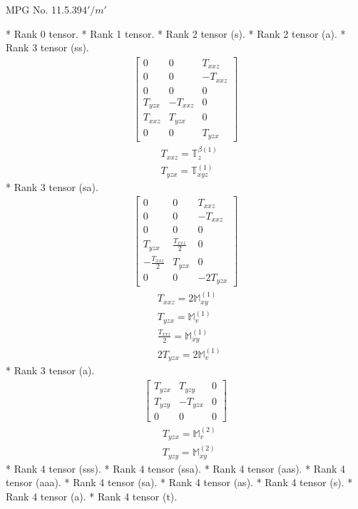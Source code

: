\documentclass[fleqn,8pt,landscape]{jsarticle}
\begin{document}
\setcounter{MaxMatrixCols}{32}

\renewcommand{\tablename}{Table~}
\renewcommand{\figurename}{Figure~}
\begin{center}
\LARGE
MPG No. 11.5.39\quad$4'/m'$
\end{center}
* Rank 0 tensor.
* Rank 1 tensor.
* Rank 2 tensor (s).
* Rank 2 tensor (a).
* Rank 3 tensor (ss).
\begin{align*}
\begin{bmatrix} 0 & 0 & T_{xxz} \\ 0 & 0 & - T_{xxz} \\ 0 & 0 & 0 \\ T_{yzx} & - T_{xxz} & 0 \\ T_{xxz} & T_{yzx} & 0 \\ 0 & 0 & T_{yzx} \end{bmatrix}
\end{align*}
\begin{align*}
& T_{xxz} = \mathbb{T}_{z}^{\beta(1)} \\
& T_{yzx} = \mathbb{T}_{xyz}^{(1)}
\end{align*}
* Rank 3 tensor (sa).
\begin{align*}
\begin{bmatrix} 0 & 0 & T_{xxz} \\ 0 & 0 & - T_{xxz} \\ 0 & 0 & 0 \\ T_{yzx} & \frac{T_{xxz}}{2} & 0 \\ - \frac{T_{xxz}}{2} & T_{yzx} & 0 \\ 0 & 0 & - 2 T_{yzx} \end{bmatrix}
\end{align*}
\begin{align*}
& T_{xxz} = 2 \mathbb{M}_{xy}^{(1)} \\
& T_{yzx} = \mathbb{M}_{v}^{(1)} \\
& \frac{T_{xxz}}{2} = \mathbb{M}_{xy}^{(1)} \\
& 2 T_{yzx} = 2 \mathbb{M}_{v}^{(1)}
\end{align*}
* Rank 3 tensor (a).
\begin{align*}
\begin{bmatrix} T_{yzx} & T_{yzy} & 0 \\ T_{yzy} & - T_{yzx} & 0 \\ 0 & 0 & 0 \end{bmatrix}
\end{align*}
\begin{align*}
& T_{yzx} = \mathbb{M}_{v}^{(2)} \\
& T_{yzy} = \mathbb{M}_{xy}^{(2)}
\end{align*}
* Rank 4 tensor (sss).
* Rank 4 tensor (ssa).
* Rank 4 tensor (aas).
* Rank 4 tensor (aaa).
* Rank 4 tensor (sa).
* Rank 4 tensor (as).
* Rank 4 tensor (s).
* Rank 4 tensor (a).
* Rank 4 tensor (t).
\end{document}
